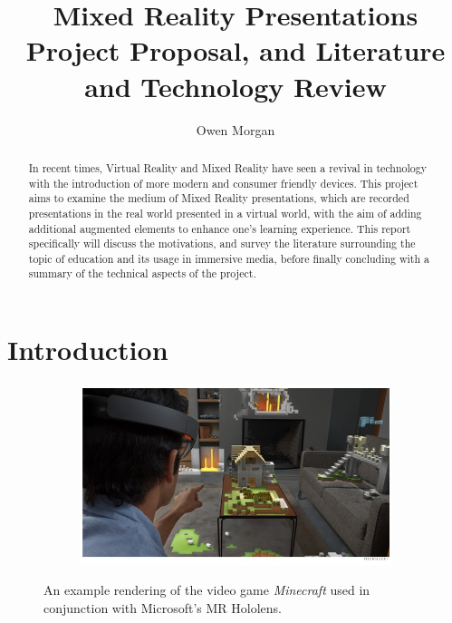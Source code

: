 \documentclass[11pt]{report}
\title{Mixed Reality Presentations\\Project Proposal, and Literature and Technology Review}
\author{Owen Morgan}
\date{}
\begin{document}
\maketitle
\begin{abstract}
In recent times, Virtual Reality and Mixed Reality have seen a revival in technology with the introduction of more modern and consumer friendly devices. This project aims to examine the medium of Mixed Reality presentations, which are recorded presentations in the real world presented in a virtual world, with the aim of adding additional augmented elements to enhance one's learning experience. This report specifically will discuss the motivations, and survey the literature surrounding the topic of education and its usage in immersive media, before finally concluding with a summary of the technical aspects of the project.
\end{abstract}
\chapter{Introduction}
\begin{figure}[h]
\centering
\begin{subfigure}[b]{0.7\textwidth}  
\includegraphics[width=\textwidth]{microsoft-minecraft.png}
\end{subfigure}
\caption{An example rendering of the video game \textit{Minecraft} used in conjunction with Microsoft's MR Hololens.\cite{Hollister2015}}
\end{figure}
\end{document}
